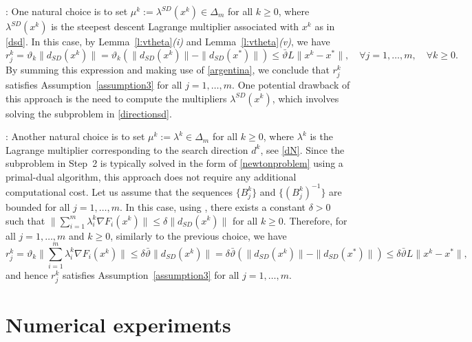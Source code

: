 \documentclass[11pt]{article}
\numberwithin{assumption}{section}
\newcommand{\dsd}{d_{SD}}
\newcommand{\xs}{x^{\ast}}
\begin{document}
: One natural choice is to set $\mu^k:=\lambda^{SD}(x^k)\in\Delta_m$ for all $k\geq 0$, where $\lambda^{SD}(x^k)$ is the steepest descent Lagrange multiplier associated with $x^k$ as in \eqref{dsd}. In this case, by Lemma~\ref{l:vtheta}{\it (i)} and Lemma~\ref{l:vtheta}{\it (v)}, we have
\[r_j^k = \vartheta_k\|\dsd(x^k)\| = \vartheta_k (\|\dsd(x^k)\| - \|\dsd(\xs)\|)\leq \bar{\vartheta} L \|x^k - \xs \|,  \quad \forall j=1,\ldots,m, \quad \forall k\geq 0.\]
By summing this expression and making use of \eqref{argentina}, we conclude that $r_j^k$ satisfies Assumption~\ref{assumption3} for all $j=1,\ldots,m$. One potential drawback of this approach is the need to compute the multipliers $\lambda^{SD}(x^k)$, which involves solving the subproblem in \eqref{directionsd}.

\vspace{8pt}
:  Another natural choice is to set $\mu^k:=\lambda^k \in\Delta_m$ for all $k\geq 0$, where $\lambda^k$ is the Lagrange multiplier corresponding to the search direction $d^k$, see \eqref{dN}.
Since the subproblem in Step~2 is typically solved in the form of \eqref{newtonproblem} using a primal-dual algorithm, this approach does not require any additional computational cost.
Let us assume that the sequences $\{B_j^k\}$ and $\{(B_j^k)^{-1}\}$ are bounded for all $j=1,\ldots,m$.
In this case, using \cite[Lemma~6]{gonccalves2021globally}, there exists a constant $\delta>0$ such that
$\|\sum_{i=1}^m\lambda_i^k \nabla F_i(x^k)\|\leq \delta \|\dsd(x^k)\|$ for all $k\geq 0$. Therefore, for all $j=1,\ldots,m$ and $k\geq 0$, similarly to the previous choice, we have
\[r_j^k = \vartheta_k\|\sum_{i=1}^m\lambda_i^k \nabla F_i(x^k)\| \leq \delta \bar{\vartheta}  \|\dsd(x^k)\|= \delta\bar{\vartheta} (\|\dsd(x^k)\| - \|\dsd(\xs)\|)\leq \delta\bar{\vartheta} L \|x^k - \xs \|,\]
and hence $r_j^k$ satisfies Assumption~\ref{assumption3} for all $j=1,\ldots,m$.


\section{Numerical experiments} \label{sec:numerical}
\end{document}
